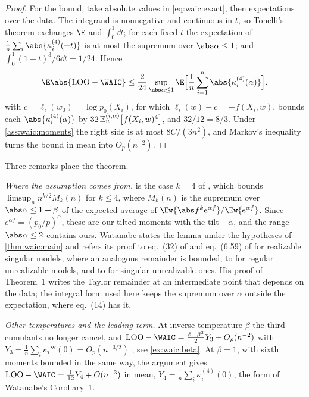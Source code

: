 \begin{refsection}
\begin{proof}
For the bound, take absolute values in \eqref{eq:waic:exact}, then expectations over the data. The integrand is nonnegative and continuous in $t$, so Tonelli's theorem exchanges $\E$ and $\int_0^1\dd t$; for each fixed $t$ the expectation of $\frac1n\sum_i\abs{\kappa_i^{(4)}(\pm t)}$ is at most the supremum over $\abs\alpha\le1$; and $\int_0^1(1-t)^3/6\dd t=1/24$. Hence
\[
\E\abs{\waicLOO-\WAIC}\le\frac2{24}\sup_{\abs\alpha\le1}\E\Bigl[\frac1n\sum_{i=1}^n\abs{\kappa_i^{(4)}(\alpha)}\Bigr].
\]
 with $c=\ell_i(w_0)=\log p_0(X_i)$, for which $\ell_i(w)-c=-f(X_i,w)$, bounds each $\abs{\kappa_i^{(4)}(\alpha)}$ by $32\,\mathbb{E}^{(i,\alpha)}_{w}\!\left[f(X_i,w)^4\right]$, and $32/12=8/3$. Under \cref{ass:waic:moments} the right side is at most $8C/(3n^2)$, and Markov's inequality turns the bound in mean into $O_p(n^{-2})$.
\end{proof}

Three remarks place the theorem.

\emph{Where the assumption comes from.}  is the case $k=4$ of \textcite[Lemma~1(2), eq.~(14)]{Watanabe2010}, which bounds $\limsup_nn^{k/2}M_k(n)$ for $k\le4$, where $M_k(n)$ is the supremum over $\abs\alpha\le1+\beta$ of the expected average of $\Ew{\abs f^ke^{\alpha f}}/\Ew{e^{\alpha f}}$. Since $e^{\alpha f}=(p_0/p)^\alpha$, these are our tilted moments with the tilt $-\alpha$, and the range $\abs\alpha\le2$ contains ours. Watanabe states the lemma under the hypotheses of \cref{thm:waic:main} and refers its proof to eq.~(32) of \textcite{Watanabe2010a} and eq.~(6.59) of \textcite{Watanabe2009} for realizable singular models, where an analogous remainder is bounded, to \textcite{Watanabe2010b} for regular unrealizable models, and to \textcite{Watanabe2010d} for singular unrealizable ones. His proof of Theorem~1 writes the Taylor remainder at an intermediate point that depends on the data; the integral form used here keeps the supremum over $\alpha$ outside the expectation, where eq.~(14) has it.

\emph{Other temperatures and the leading term.} At inverse temperature $\beta$ the third cumulants no longer cancel, and $\waicLOO-\WAIC=\frac{\beta-\beta^2}2Y_3+O_p(n^{-2})$ with $Y_3=\frac1n\sum_i\kappa_i'''(0)=O_p(n^{-3/2})$ \parencite[Corollary~1]{Watanabe2010}; see \cref{ex:waic:beta}. At $\beta=1$, with sixth moments bounded in the same way, the argument gives $\waicLOO-\WAIC=\frac1{12}Y_4+O(n^{-3})$ in mean, $Y_4=\frac1n\sum_i\kappa_i^{(4)}(0)$, the form of Watanabe's Corollary~1.


\end{refsection}
